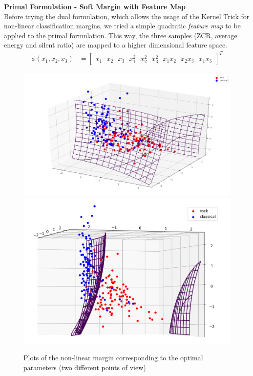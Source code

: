 \documentclass[12pt]{article}
\begin{document}
	\textbf{Primal Formulation - Soft Margin with Feature Map}\\
	Before trying the dual formulation, which allows the usage of the Kernel Trick for non-linear classification margins, we tried a simple quadratic \textit{feature map} to be applied to the primal formulation. This way, the three samples (ZCR, average energy and silent ratio) are mapped to a higher dimensional feature space.
	\begin{align}
		\phi(x_1, x_2, x_3) &= \begin{bmatrix}
			x_1 \ \ \
			x_2 \ \ \
			x_3 \ \ \
			x_1^2 \ \ \
			x_2^2 \ \ \
			x_3^2 \ \ \
			x_1x_2 \ \ \
			x_2x_3 \ \ \
			x_1x_3
		\end{bmatrix} ^T
	\end{align}

	\begin{figure}[H]
		\includegraphics[scale=0.4]{quad_feat}
		\includegraphics[scale=0.4]{quad_feat_side}
		\caption{Plots of the non-linear margin corresponding to the optimal parameters (two different points of view)}
	\end{figure}
	
\end{document}
